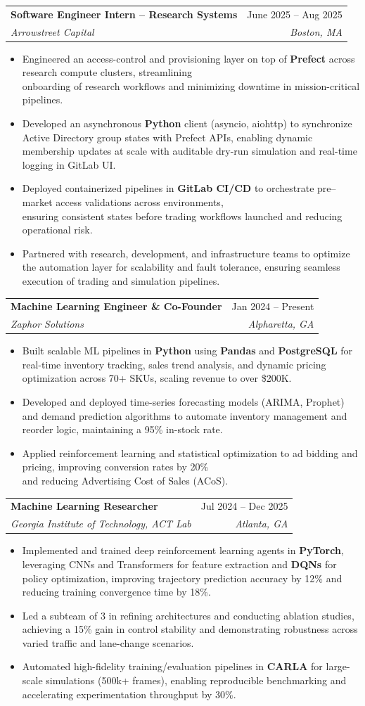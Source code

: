 \documentclass[letterpaper,10pt]{article}
\makeatletter
\newcommand{\resumeItem}[1]{\item\small{{#1 \vspace{-2pt}}}}
\newcommand{\resumeItemListEnd}{\end{itemize}\vspace{-6pt}}
\newcommand{\resumeSubheading}[4]{
  \vspace{-2pt}\item
    \begin{tabular*}{0.97\textwidth}[t]{l@{\extracolsep{\fill}}r}
      \textbf{#1} & #2 \\
      \textit{\small#3} & \textit{\small #4} \\
    \end{tabular*}\vspace{-7pt}
}
\newcommand{\resumeItemListStart}{\begin{itemize}}
\makeatother
\begin{document}
  \resumeSubheading
  {Software Engineer Intern – Research Systems}{June 2025 -- Aug 2025}
  {Arrowstreet Capital}{Boston, MA}
  \resumeItemListStart
    \resumeItem{Engineered an access-control and provisioning layer on top of \textbf{Prefect} across research compute clusters, streamlining \\ onboarding of research workflows and minimizing downtime in mission-critical pipelines.}
    \resumeItem{Developed an asynchronous \textbf{Python} client (asyncio, aiohttp) to synchronize Active Directory group states with Prefect APIs, enabling dynamic membership updates at scale with auditable dry-run simulation and real-time logging in GitLab UI.}
    \resumeItem{Deployed containerized pipelines in \textbf{GitLab CI/CD} to orchestrate pre–market access validations across environments, \\ensuring consistent states before trading workflows launched and reducing operational risk.}
    \resumeItem{Partnered with research, development, and infrastructure teams to optimize the automation layer for scalability and fault tolerance, ensuring seamless execution of trading and simulation pipelines.}
  \resumeItemListEnd

  \resumeSubheading
  {Machine Learning Engineer \& Co-Founder}{Jan 2024 -- Present}
  {Zaphor Solutions}{Alpharetta, GA}
  \resumeItemListStart
    \resumeItem{Built scalable ML pipelines in \textbf{Python} using \textbf{Pandas} and \textbf{PostgreSQL} for real-time inventory tracking, sales trend analysis, and dynamic pricing optimization across 70+ SKUs, scaling revenue to over \$200K.}
    \resumeItem{Developed and deployed time-series forecasting models (ARIMA, Prophet) and demand prediction algorithms to automate inventory management and reorder logic, maintaining a 95\% in-stock rate.}
    \resumeItem{Applied reinforcement learning and statistical optimization to ad bidding and pricing, improving conversion rates by 20\% \\and reducing Advertising Cost of Sales (ACoS).}
  \resumeItemListEnd

  \resumeSubheading
  {Machine Learning Researcher}{Jul 2024 -- Dec 2025}
  {Georgia Institute of Technology, ACT Lab}{Atlanta, GA}
  \resumeItemListStart
    \resumeItem{Implemented and trained deep reinforcement learning agents in \textbf{PyTorch}, leveraging CNNs and Transformers for feature extraction and \textbf{DQNs} for policy optimization, improving trajectory prediction accuracy by 12\% and reducing training convergence time by 18\%.}
    \resumeItem{Led a subteam of 3 in refining architectures and conducting ablation studies, achieving a 15\% gain in control stability and demonstrating robustness across varied traffic and lane-change scenarios.}
    \resumeItem{Automated high-fidelity training/evaluation pipelines in \textbf{CARLA} for large-scale simulations (500k+ frames), enabling reproducible benchmarking and accelerating experimentation throughput by 30\%.}
  \resumeItemListEnd
\end{document}
